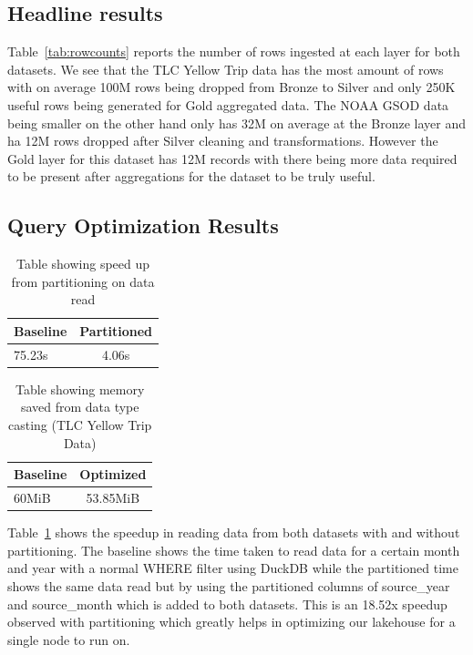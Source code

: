 \documentclass[conference]{IEEEtran}
\begin{document}
\subsection{Headline results}
Table~\ref{tab:rowcounts} reports the number of rows ingested at each layer for both datasets. We see that the TLC Yellow Trip data has the most amount of rows with on average 100M rows being dropped from Bronze to Silver and only 250K useful rows being generated for Gold aggregated data. The NOAA GSOD data being smaller on the other hand only has 32M on average at the Bronze layer and ha 12M rows dropped after Silver cleaning and transformations. However the Gold layer for this dataset has 12M records with there being more data required to be present after aggregations for the dataset to be truly useful.

\subsection{Query Optimization Results}

\begin{table}[h]
    \centering
    \caption{Table showing speed up from partitioning on data read}
    \label{tab:partioning}
    \begin{tabular}{|l|c|}
        \hline
        \textbf{Baseline} & \textbf{Partitioned} \\
        \hline
        75.23s & 4.06s \\
        \hline
    \end{tabular}
\end{table}

\begin{table}[h]
    \centering
    \caption{Table showing memory saved from data type casting (TLC Yellow Trip Data)}
    \label{tab:datatype}
    \begin{tabular}{|l|c|}
        \hline
        \textbf{Baseline} & \textbf{Optimized} \\
        \hline
        60MiB & 53.85MiB \\
        \hline
    \end{tabular}
\end{table}

Table~\ref{tab:partioning} shows the speedup in reading data from both datasets with and without partitioning. The baseline shows the time taken to read data for a certain month and year with a normal WHERE filter using DuckDB while the partitioned time shows the same data read but by using the partitioned columns of source\_year and source\_month which is added to both datasets. This is an 18.52x speedup observed with partitioning which greatly helps in optimizing our lakehouse for a single node to run on.
\end{document}
